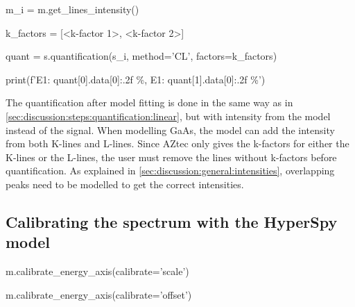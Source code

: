 

\begin{lcverbatim}
    m_i = m.get_lines_intensity()

    k_factors = [<k-factor 1>, <k-factor 2>]

    quant = s.quantification(s_i, method='CL', factors=k_factors)

    print(f'E1: {quant[0].data[0]:.2f} \%, E1: {quant[1].data[0]:.2f} \%')

\end{lcverbatim}

The quantification after model fitting is done in the same way as in \cref{sec:discussion:steps:quantification:linear}, but with intensity from the model instead of the signal.
When modelling GaAs, the model can add the intensity from both K-lines and L-lines.
Since AZtec only gives the k-factors for either the K-lines or the L-lines, the user must remove the lines without k-factors before quantification.
As explained in \cref{sec:discussion:general:intensities}, overlapping peaks need to be modelled to get the correct intensities.






\subsection{Calibrating the spectrum with the HyperSpy model}
\label{sec:discussion:steps:HyperSpycalibration}





\begin{lcverbatim}

    m.calibrate_energy_axis(calibrate='scale')

    m.calibrate_energy_axis(calibrate='offset')

\end{lcverbatim}

